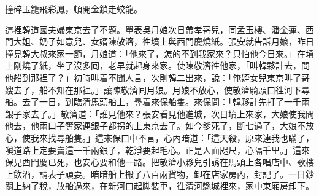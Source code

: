 \begin{myquote}
撞碎玉籠飛彩鳳，頓開金鎖走蛟龍。
\end{myquote}

這裡韓道國夫婦東京去了不題。單表吳月娘次日帶孝哥兒，同孟玉樓、潘金蓮、西門大姐、奶子如意兒、女婿陳敬濟，徃墳上與西門慶燒紙。張安就告訴月娘，昨日撞見韓大叔來家一節，月娘道：「他來了，怎的不到我家來？只怕他今日來。」在墳上剛燒了紙，坐了沒多囘，老早就起身來家。使陳敬濟徃他家，「叫韓夥計去，問他船到那裡了？」初時叫着不聞人言，次則韓二出來，說：「俺姪女兒東京叫了哥嫂去了，船不知在那裡。」讓陳敬濟囘月娘。月娘不放心，使敬濟騎頭口徃河下尋船。去了一日，到臨清馬頭船上，尋着來保船隻。來保問：「韓夥計先打了一千兩銀子家去了。」敬濟道：「誰見他來？張安看見他進城，次日墳上來家，大娘使我問他去，他兩口子奪家連銀子都拐的上東京去了。如今爹死了，斷七過了，大娘不放心，使我來找尋船隻。」這來保口中不言，心內暗道：「這天殺，原來連我也瞞了，嗔道路上定要賣這一千兩銀子，乾淨要起毛心。正是人面咫尺，心隔千里。」這來保見西門慶已死，也安心要和他一路。把敬濟小夥兒引誘在馬頭上各唱店中、歌樓上飲酒，請表子頑耍。暗暗船上搬了八百兩貨物，卸在店家房內，封記了。一日鈔關上納了稅，放船過來，在新河口起脚裝車，徃清河縣城裡來，家中東廂房卸下。

